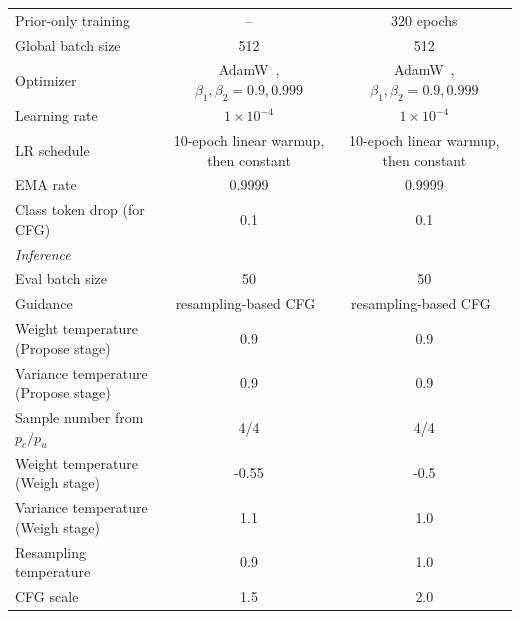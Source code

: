 \begin{table}[t]
\begin{tabular}{lcc}
Prior-only training
& --
& 320 epochs \\

Global batch size
& 512
& 512 \\

Optimizer
& AdamW~\cite{adamw}, $\beta_1,\beta_2=0.9,0.999$
& AdamW~\cite{adamw}, $\beta_1,\beta_2=0.9,0.999$ \\

Learning rate
& $1\times10^{-4}$
& $1\times10^{-4}$ \\

LR schedule
& 10-epoch linear warmup, then constant
& 10-epoch linear warmup, then constant \\

EMA rate & 0.9999 & 0.9999 \\

Class token drop (for CFG) & 0.1 & 0.1 \\
\midrule
\multicolumn{3}{l}{\textit{Inference}} \\
\midrule

Eval batch size & 50 & 50 \\
Guidance
& resampling-based CFG~\cite{zheng2025farmer}
& resampling-based CFG~\cite{zheng2025farmer} \\

Weight temperature (Propose stage) & 0.9 & 0.9\\
Variance temperature (Propose stage) & 0.9 & 0.9\\
Sample number from $p_c/p_u$ & 4/4 & 4/4\\
Weight temperature (Weigh stage) & -0.55 & -0.5\\
Variance temperature (Weigh stage) & 1.1 & 1.0 \\
Resampling temperature & 0.9 & 1.0 \\
CFG scale
& 1.5
& 2.0 \\

\bottomrule
\end{tabular}
\end{table}

